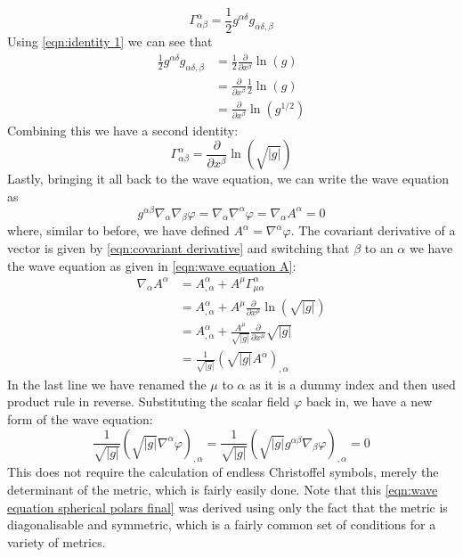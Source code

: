 \documentclass[11pt]{article}
\numberwithin{equation}{section}
\numberwithin{figure}{section}
\numberwithin{table}{section}
\begin{document}
\begin{equation*}
    \Gamma^\alpha_{\alpha\beta}=\frac{1}{2}g^{\alpha\delta}g_{\alpha\delta,\beta}
\end{equation*}
Using \cref{eqn:identity 1} we can see that 
\begin{align*}
    \frac{1}{2}g^{\alpha\delta}g_{\alpha\delta,\beta}&=\frac{1}{2}\frac{\partial}{\partial x^\beta}\ln(g)\\
    &=\frac{\partial}{\partial x^\beta}\frac{1}{2}\ln(g)\\
    &=\frac{\partial}{\partial x^\beta}\ln(g^{1/2})
\end{align*}
Combining this we have a second identity:
\begin{equation}
    \Gamma^\alpha_{\alpha\beta}=\frac{\partial}{\partial x^\beta}\ln(\sqrt{|g|})
    \label{eqn:identity 2}
\end{equation}
Lastly, bringing it all back to the wave equation, we can write the wave equation as 
\begin{equation}
    g^{\alpha\beta}\nabla_\alpha\nabla_\beta \varphi=\nabla_\alpha\nabla^\alpha \varphi=\nabla_\alpha A^\alpha=0
    \label{eqn:wave equation A}
\end{equation}
where, similar to before, we have defined $A^\alpha = \nabla^\alpha \varphi$. The covariant derivative of a vector is given by \cref{eqn:covariant derivative} and switching that $\beta$ to an $\alpha$ we have the wave equation as given in \cref{eqn:wave equation A}:
\begin{align*}
    \nabla_\alpha A^\alpha&=A^\alpha_{,\alpha}+A^\mu\Gamma^{\alpha}_{\mu\alpha}\\
    &=A^\alpha_{,\alpha}+A^\mu\frac{\partial}{\partial x^\mu}\ln(\sqrt{|g|})\\
    &=A^\alpha_{,\alpha}+\frac{A^\mu}{\sqrt{|g|}}\frac{\partial}{\partial x^\mu}\sqrt{|g|}\\
    &=\frac{1}{\sqrt{|g|}}(\sqrt{|g|}A^\alpha)_{,\alpha}
\end{align*}
In the last line we have renamed the $\mu$ to $\alpha$ as it is a dummy index and then used product rule in reverse. Substituting the scalar field $\varphi$ back in, we have a new form of the wave equation:
\begin{equation}
    \frac{1}{\sqrt{|g|}}(\sqrt{|g|}\nabla^\alpha\varphi)_{,\alpha}=\frac{1}{\sqrt{|g|}}(\sqrt{|g|}g^{\alpha\beta}\nabla_\beta\varphi)_{,\alpha}=0
    \label{eqn:wave equation spherical polars final}
\end{equation}
This does not require the calculation of endless Christoffel symbols, merely the determinant of the metric, which is fairly easily done. Note that this \cref{eqn:wave equation spherical polars final} was derived using only the fact that the metric is diagonalisable and symmetric, which is a fairly common set of conditions for a variety of metrics.
\end{document}
